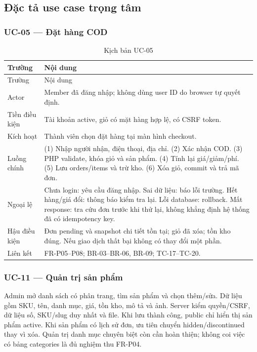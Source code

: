 \clearpage
\subsection{Đặc tả use case trọng tâm}
\subsubsection{UC-05 — Đặt hàng COD}
\begin{longtable}{@{}P{3cm}P{12.1cm}@{}}
\caption{Kịch bản UC-05}\label{tab:uc-checkout}\\
\toprule Trường & Nội dung\\\midrule\endfirsthead
\toprule Trường & Nội dung\\\midrule\endhead
Actor & Member đã đăng nhập; không dùng user ID do browser tự quyết định.\\
Tiền điều kiện & Tài khoản active, giỏ có mặt hàng hợp lệ, có CSRF token.\\
Kích hoạt & Thành viên chọn đặt hàng tại màn hình checkout.\\
Luồng chính & (1) Nhập người nhận, điện thoại, địa chỉ. (2) Xác nhận COD. (3) PHP validate, khóa giỏ và sản phẩm. (4) Tính lại giá/giảm/phí. (5) Lưu orders/items và trừ kho. (6) Xóa giỏ, commit và trả mã đơn.\\
Ngoại lệ & Chưa login: yêu cầu đăng nhập. Sai dữ liệu: báo lỗi trường. Hết hàng/giá đổi: thông báo kiểm tra lại. Lỗi database: rollback. Mất response: tra cứu đơn trước khi thử lại, không khẳng định hệ thống đã có idempotency key.\\
Hậu điều kiện & Đơn pending và snapshot chi tiết tồn tại; giỏ đã xóa; tồn kho đúng. Nếu giao dịch thất bại không có thay đổi một phần.\\
Liên kết & FR-P05–P08; BR-03–BR-06, BR-09; TC-17–TC-20.\\
\bottomrule\end{longtable}

\subsubsection{UC-11 — Quản trị sản phẩm}
Admin mở danh sách có phân trang, tìm sản phẩm và chọn thêm/sửa. Dữ liệu gồm SKU, tên, danh mục, giá, tồn kho, mô tả và ảnh. Server kiểm quyền/CSRF, dữ liệu số, SKU/slug duy nhất và file. Khi lưu thành công, public chỉ hiển thị sản phẩm active. Khi sản phẩm có lịch sử đơn, ưu tiên chuyển hidden/discontinued thay vì xóa. Quản trị danh mục chuyên biệt còn cần hoàn thiện; không coi việc có bảng categories là đủ nghiệm thu FR-P04.

